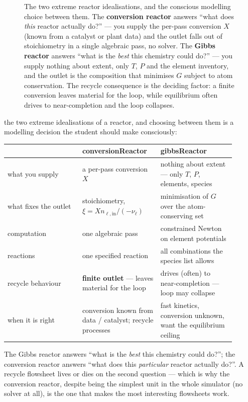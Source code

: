 \documentclass[11pt,a4paper]{article}
\begin{document}
\begin{figure}[ht]
\begin{tikzpicture}
\end{tikzpicture}
\caption{The two extreme reactor idealisations, and the conscious
modelling choice between them.  The \textbf{conversion reactor} answers
``what does \emph{this} reactor actually do?'' --- you supply the
per-pass conversion $X$ (known from a catalyst or plant data) and the
outlet falls out of stoichiometry in a single algebraic pass, no solver.
The \textbf{Gibbs reactor} answers ``what is the \emph{best} this
chemistry could do?'' --- you supply nothing about extent, only $T$,
$P$ and the element inventory, and the outlet is the composition that
minimises $G$ subject to atom conservation.  The recycle consequence is
the deciding factor: a finite conversion leaves material for the loop,
while equilibrium often drives to near-completion and the loop
collapses.}
\label{fig:conversion-vs-gibbs}
\end{figure}

the two extreme idealisations of a reactor, and choosing between them is
a modelling decision the student should make consciously:

\begin{center}
\begin{tabular}{p{0.30\linewidth} p{0.30\linewidth} p{0.30\linewidth}}
   \toprule
    & \textbf{conversionReactor} & \textbf{gibbsReactor} \\
   \midrule
   what you supply & a per-pass conversion $X$ & nothing about extent ---
        only $T$, $P$, elements, species \\
   what fixes the outlet & stoichiometry,
        $\xi = X n_{\ell,\mathrm{in}}/(-\nu_\ell)$ &
        minimisation of $G$ over the atom-conserving set \\
   computation & one algebraic pass & constrained Newton on element
        potentials \\
   reactions & one specified reaction & all combinations the species
        list allows \\
   recycle behaviour & \textbf{finite outlet} --- leaves material for
        the loop & drives (often) to near-completion ---
        loop may collapse \\
   when it is right & conversion known from data / catalyst; recycle
        processes & fast kinetics, conversion unknown, want the
        equilibrium ceiling \\
   \bottomrule
\end{tabular}
\end{center}

\begin{intuition}
The Gibbs reactor answers ``what is the \emph{best} this chemistry could
do?''; the conversion reactor answers ``what does this \emph{particular}
reactor actually do?''. A recycle flowsheet lives or dies on the second
question --- which is why the conversion reactor, despite being the
simplest unit in the whole simulator (no solver at all), is the one that
makes the most interesting flowsheets work.
\end{intuition}
\end{document}
